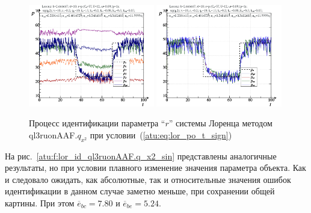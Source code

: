 \begin{figure}[ht!]
  \centerline{
    \includegraphics[width=0.49\textwidth]{p/cha/lor/ql3ruonAAF/lor_ql3ruonAAF_qy2-p_t_pi_sign.png}
    \hfill
    \includegraphics[width=0.49\textwidth]{p/cha/lor/ql3ruonAAF/lor_ql3ruonAAF_qy2-p_t_pz_sign.png}
  }
  \caption{Процесс идентификации параметра ``$r$'' системы Лоренца методом ql3ruonAAF.$q_{x^2}$ при условии~(\ref{atu:eq:lor_po_t_sign})}
  \label{atu:f:lor_id_ql3ruonAAF.q_x2_sign}
\end{figure}


На рис.~\ref{atu:f:lor_id_ql3ruonAAF.q_x2_sin} представлены аналогичные результаты,
но при условии плавного изменение значения параметра объекта. Как и следовало ожидать,
как абсолютные, так и относительные значения ошибок идентификации в данном случае заметно
меньше, при сохранении общей картины.
При этом
$\overline{e}_{bc}=7.80$
и
$\overline{e}_{be}=5.24$.


